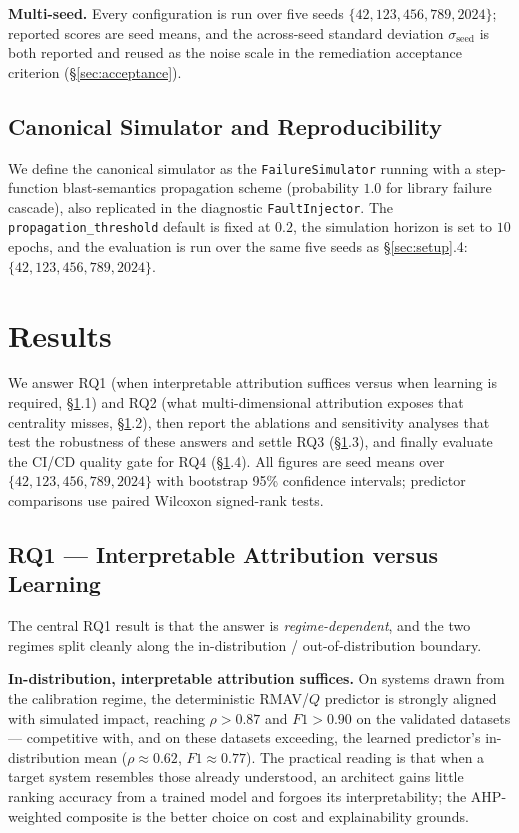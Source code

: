 \documentclass[review]{elsarticle}
\begin{document}
\textbf{Multi-seed.} Every configuration is run over five seeds $\{42, 123, 456, 789, 2024\}$;
reported scores are seed means, and the across-seed standard deviation $\sigma_{\text{seed}}$ is both
reported and reused as the noise scale in the remediation acceptance criterion (\S\ref{sec:acceptance}).

\subsection{Canonical Simulator and Reproducibility}

We define the canonical simulator as the \texttt{FailureSimulator} running with a step-function
blast-semantics propagation scheme (probability $1.0$ for library failure cascade), also replicated
in the diagnostic \texttt{FaultInjector}. The \texttt{propagation\_threshold} default is fixed at
$0.2$, the simulation horizon is set to $10$ epochs, and the evaluation is run over the same five
seeds as \S\ref{sec:setup}.4: $\{42, 123, 456, 789, 2024\}$.

\section{Results}
\label{sec:results}

We answer RQ1 (when interpretable attribution suffices versus when learning is required,
\S\ref{sec:results}.1) and RQ2 (what multi-dimensional attribution exposes that centrality misses,
\S\ref{sec:results}.2), then report the ablations and sensitivity analyses that test the robustness
of these answers and settle RQ3 (\S\ref{sec:results}.3), and finally evaluate the CI/CD quality gate
for RQ4 (\S\ref{sec:results}.4). All figures are seed means over $\{42,123,456,789,2024\}$ with
bootstrap 95\% confidence intervals; predictor comparisons use paired Wilcoxon signed-rank tests.

\subsection{RQ1 --- Interpretable Attribution versus Learning}

The central RQ1 result is that the answer is \emph{regime-dependent}, and the two regimes split
cleanly along the in-distribution / out-of-distribution boundary.

\textbf{In-distribution, interpretable attribution suffices.} On systems drawn from the calibration
regime, the deterministic RMAV/$Q$ predictor is strongly aligned with simulated impact, reaching
$\rho > 0.87$ and $F1 > 0.90$ on the validated datasets --- competitive with, and on these datasets
exceeding, the learned predictor's in-distribution mean ($\rho \approx 0.62$, $F1 \approx 0.77$).
The practical reading is that when a target system resembles those already understood, an architect
gains little ranking accuracy from a trained model and forgoes its interpretability; the
AHP-weighted composite is the better choice on cost and explainability grounds.
\end{document}
